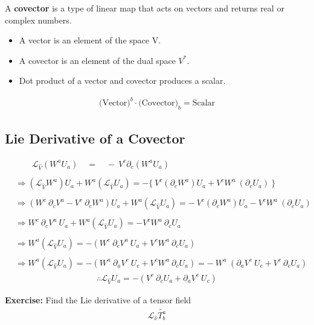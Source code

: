 \documentclass[14pt]{article} %
\begin{document}
\begin{tcolorbox}[ title=Covector]
A \textbf{covector} is a type of linear map that acts on vectors and returns real or complex numbers.
\begin{itemize}
    \item A vector is an element of the space V.
    \item A covector is an element of the dual space $V^*$.
    \item Dot product of a vector and covector produces a scalar.
\end{itemize}
\begin{align*}
\text{(Vector)}^b \cdot \text{(Covector)}_b = \text{Scalar}
\end{align*}
\end{tcolorbox}
\subsection{Lie Derivative of a Covector}
\begin{align*}
&\quad \quad \mathscr{L}_{\hat{V}} (W^a U_a) \quad = \quad - ~V^c \partial_c (W^a U_a) \\\\
&\Rightarrow (\mathscr{L}_{\hat{V}} W^a) U_a + W^a (\mathscr{L}_{\hat{V}} U_a) = - \{~V^c (\partial_c W^a)U_a + V^c W^a~ (\partial_c U_a)~\} \\\\
&\Rightarrow (W^c~ \partial_c V^a - V^c~ \partial_c W^a) U_a + W^a (\mathscr{L}_{\hat{V}} U_a) = -~V^c (\partial_c W^a)U_a - V^c W^a~ (\partial_c U_a) \\\\
& \Rightarrow W^c~ \partial_c V^a ~U_a + W^a (\mathscr{L}_{\hat{V}} U_a) = - V^c W^a~\partial_c U_a \\\\
& \Rightarrow W^a (\mathscr{L}_{\hat{V}} U_a) = - (W^c~ \partial_c V^a ~U_a+V^c W^a~\partial_c U_a) \\\\
& \Rightarrow W^a (\mathscr{L}_{\hat{V}} U_a) = - (W^a~ \partial_a V^c ~U_c+V^c W^a~\partial_c U_a) = -~W^a~(\partial_a V^c ~U_c+V^c~\partial_c U_a)
\end{align*}
\begin{align*}
\boxed{\therefore \mathscr{L}_{\hat{V}} U_a = -(V^c~\partial_c U_a + \partial_a V^c ~U_c)}
\end{align*}
\begin{tcolorbox}
\noindent
\textbf{Exercise:} Find the Lie derivative of a tensor field 
\begin{align*}
    \mathscr{L}_{\hat{\nu}} \tilde{T^a_b}
\end{align*}
\end{tcolorbox}
\end{document}
